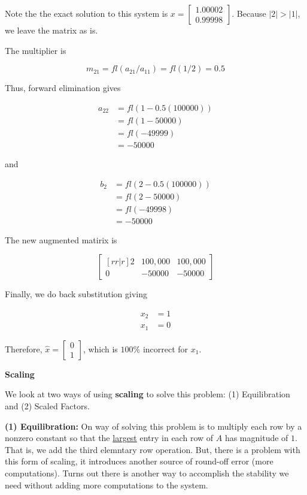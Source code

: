 \documentclass [titlepage,12pt,letter] {article}
\begin{document}
Note the the exact solution to this system is $x=\begin{bmatrix}1.00002 \\ 0.99998 \end{bmatrix}$. Because $|2| > |1|$, we leave the matrix as is.

The multiplier is

\[
m_{21}=fl(a_{21}/a_{11})=fl(1/2)=0.5
\]

Thus, forward elimination gives

\begin{align*}
a_{22}&=fl(1-0.5(100000)) \\
&=fl(1-50000) \\
&=fl(-49999) \\
&=-50000
\end{align*}

and

\begin{align*}
b_2&=fl(2-0.5(100000)) \\
&=fl(2-50000) \\
&=fl(-49998) \\
&=-50000
\end{align*}

The new augmented matirix is

\[
\begin{bmatrix}[rr|r]
 2  &  100,000 & 100,000 \\
  0  &  -50000  &  -50000
\end{bmatrix}
\]

Finally, we do back substitution giving

\begin{align*}
x_2&=1 \\
x_1&=0
\end{align*}

Therefore, $\hat{x}=\begin{bmatrix} 0 \\ 1 \end{bmatrix}$, which is $100\%$ incorrect for $x_1$.

{\bf Scaling}

We look at two ways of using {\bf scaling} to solve this problem: (1) Equilibration and (2) Scaled Factors.

\vspace{\baselineskip}
{\bf (1) Equilibration:}
On way of solving this problem is to multiply each row by a nonzero constant so that the \underline{largest} entry in each row of $A$ has magnitude of $1$. 
That is, we add the third elemntary row operation. But, there is a problem with this form of scaling, it introduces another source of round-off error (more computations). 
Turns out there is another way to accomplish the stability we need without adding more computations to the system.
\end{document}
